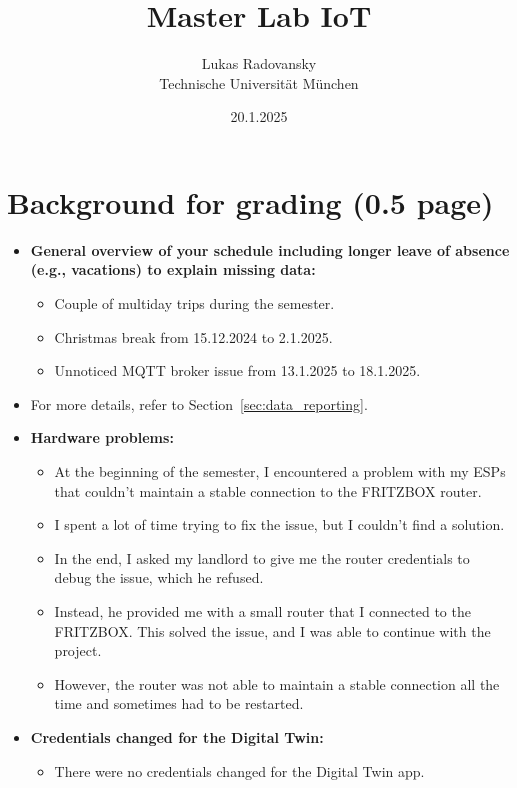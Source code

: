 \documentclass[A4,10pt]{article}
\author{Lukas Radovansky \\ Technische Universit\"at M\"unchen}
\title{Master Lab IoT}
\date{20.1.2025}
\begin{document}
\maketitle
\newpage
\tableofcontents
\newpage

\section{Background for grading (0.5 page)}
\begin{itemize}
	\item \textbf{General overview of your schedule including longer leave of absence (e.g., vacations) to explain missing data:}
	\begin{itemize}
		\item Couple of multiday trips during the semester.
		\item Christmas break from 15.12.2024 to 2.1.2025.
		\item Unnoticed MQTT broker issue from 13.1.2025 to 18.1.2025.
	\end{itemize}
	\item For more details, refer to Section~\ref{sec:data_reporting}.

	\item \textbf{Hardware problems:}
	\begin{itemize}
		\item At the beginning of the semester, I encountered a problem with my ESPs that couldn't maintain a stable connection to the FRITZBOX router.
		\item I spent a lot of time trying to fix the issue, but I couldn't find a solution.
		\item In the end, I asked my landlord to give me the router credentials to debug the issue, which he refused.
		\item Instead, he provided me with a small router that I connected to the FRITZBOX. This solved the issue, and I was able to continue with the project.
		\item However, the router was not able to maintain a stable connection all the time and sometimes had to be restarted.
	\end{itemize}

	\item \textbf{Credentials changed for the Digital Twin:}
	\begin{itemize}
		\item There were no credentials changed for the Digital Twin app.
	\end{itemize}
\end{itemize}
\end{document}
